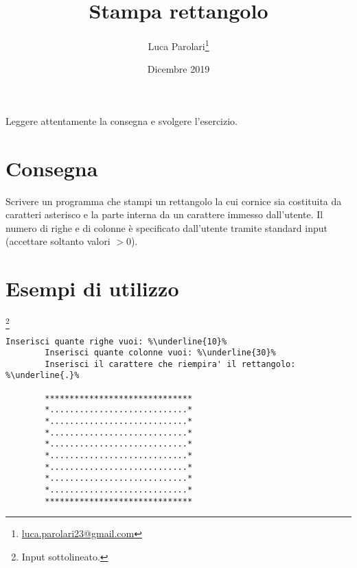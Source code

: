 \documentclass[addpoints,12pt,answers]{exam}
\author{Luca Parolari\footnote{\href{mailto:luca.parolari23@gmail.com}{luca.parolari23@gmail.com}}}
\begin{document}
    
    \title{Stampa rettangolo}
    \date{Dicembre 2019}
    
    \maketitle
    
    Leggere attentamente la consegna e svolgere l'esercizio.
    
    \section{Consegna}
    
    Scrivere un programma che stampi un rettangolo la cui cornice sia costituita da caratteri asterisco e la parte interna da un carattere immesso dall'utente. Il numero di righe e di colonne è specificato
    dall'utente tramite standard input (accettare soltanto valori $> 0$).
    
    \section{Esempi di utilizzo}
	\footnote{Input sottolineato.}

	\begin{lstlisting}[style=verbatim]
		Inserisci quante righe vuoi: %\underline{10}%
		Inserisci quante colonne vuoi: %\underline{30}%
		Inserisci il carattere che riempira' il rettangolo: %\underline{.}%
		
		******************************
		*............................*
		*............................*
		*............................*
		*............................*
		*............................*
		*............................*
		*............................*
		*............................*
		******************************
	\end{lstlisting}
    
\end{document}
